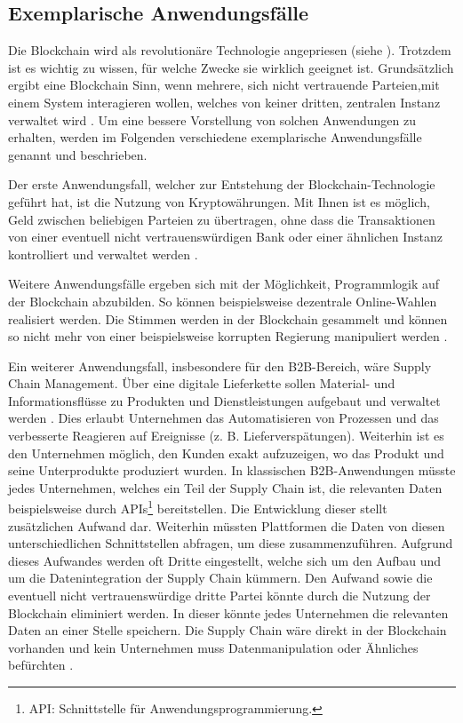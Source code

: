 \subsection{Exemplarische Anwendungsfälle}
\label{subsec:use-cases}
Die Blockchain wird als revolutionäre Technologie angepriesen (siehe \cite{TapscottBlockchainRevolutionWieTechnologie2016}). Trotzdem ist es wichtig zu wissen, für welche Zwecke sie wirklich geeignet ist. Grundsätzlich ergibt eine Blockchain Sinn, wenn mehrere, sich nicht vertrauende Parteien,mit einem System interagieren wollen, welches von keiner dritten, zentralen Instanz verwaltet wird \cite{WustyouneedBlockchain2017}. Um eine bessere Vorstellung von solchen Anwendungen zu erhalten, werden im Folgenden verschiedene exemplarische Anwendungsfälle genannt und beschrieben.

Der erste Anwendungsfall, welcher zur Entstehung der Blockchain-Technologie geführt hat, ist die Nutzung von Kryptowährungen. Mit Ihnen ist es möglich, Geld zwischen beliebigen Parteien zu übertragen, ohne dass die Transaktionen von einer eventuell nicht vertrauenswürdigen Bank oder einer ähnlichen Instanz kontrolliert und verwaltet werden \cite[S.~\Rn{10}]{SwanBlockchainblueprintnew2015}.

Weitere Anwendungsfälle ergeben sich mit der Möglichkeit, Programmlogik auf der Blockchain abzubilden. So können beispielsweise dezentrale Online-Wahlen realisiert werden. Die Stimmen werden in der Blockchain gesammelt und können so nicht mehr von einer beispielsweise korrupten Regierung manipuliert werden \cite{CastorEthereumVotingScheme2017}.

Ein weiterer Anwendungsfall, insbesondere für den \acs{B2B}-Bereich, wäre Supply Chain Management. Über eine digitale Lieferkette sollen Material- und Informationsflüsse zu Produkten und Dienstleistungen aufgebaut und verwaltet werden \cite{KriegerSupplyChainManagement}. Dies erlaubt Unternehmen das Automatisieren von Prozessen und das verbesserte Reagieren auf Ereignisse (z. B. Lieferverspätungen). Weiterhin ist es den Unternehmen möglich, den Kunden exakt aufzuzeigen, wo das Produkt und seine Unterprodukte produziert wurden. In klassischen \acs{B2B}-Anwendungen müsste jedes Unternehmen, welches ein Teil der Supply Chain ist, die relevanten Daten beispielsweise durch APIs\footnote{API: Schnittstelle für Anwendungsprogrammierung\cite{DigHowAPIsevolve2006}.} bereitstellen. Die Entwicklung dieser stellt zusätzlichen Aufwand dar. Weiterhin müssten Plattformen die Daten von diesen unterschiedlichen Schnittstellen abfragen, um diese zusammenzuführen. Aufgrund dieses Aufwandes werden oft Dritte eingestellt, welche sich um den Aufbau und um die Datenintegration der Supply Chain kümmern. Den Aufwand sowie die eventuell nicht vertrauenswürdige dritte Partei könnte durch die Nutzung der Blockchain eliminiert werden. In dieser könnte jedes Unternehmen die relevanten Daten an einer Stelle speichern. Die Supply Chain wäre direkt in der Blockchain vorhanden und kein Unternehmen muss Datenmanipulation oder Ähnliches befürchten \cite{KorpelaDigitalSupplyChain2017}.

